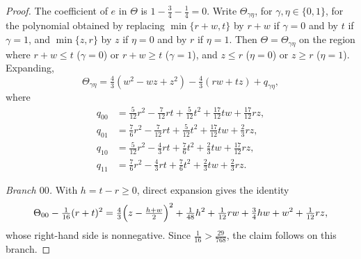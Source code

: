 \documentclass{amsart}
\theoremstyle{definition}
\numberwithin{equation}{section}
\numberwithin{table}{section}
\begin{document}
\begin{proof}
The coefficient of $e$ in $\Theta$ is $1-\frac34-\frac14=0$. Write $\Theta_{\gamma\eta}$, for $\gamma,\eta\in\{0,1\}$, for the polynomial obtained by replacing $\min\{r+w,t\}$ by $r+w$ if $\gamma=0$ and by $t$ if $\gamma=1$, and $\min\{z,r\}$ by $z$ if $\eta=0$ and by $r$ if $\eta=1$. Then $\Theta=\Theta_{\gamma\eta}$ on the region where $r+w\le t$ ($\gamma=0$) or $r+w\ge t$ ($\gamma=1$), and $z\le r$ ($\eta=0$) or $z\ge r$ ($\eta=1$). Expanding,
\[
\Theta_{\gamma\eta}=\tfrac43(w^2-wz+z^2)-\tfrac43(rw+tz)+q_{\gamma\eta},
\]
where
\begin{align*}
q_{00}&=\tfrac{5}{12}r^2-\tfrac{7}{12}rt+\tfrac{5}{12}t^2+\tfrac{17}{12}tw+\tfrac{17}{12}rz,\\
q_{01}&=\tfrac{7}{6}r^2-\tfrac{7}{12}rt+\tfrac{5}{12}t^2+\tfrac{17}{12}tw+\tfrac23rz,\\
q_{10}&=\tfrac{5}{12}r^2-\tfrac{4}{3}rt+\tfrac{7}{6}t^2+\tfrac23tw+\tfrac{17}{12}rz,\\
q_{11}&=\tfrac{7}{6}r^2-\tfrac{4}{3}rt+\tfrac{7}{6}t^2+\tfrac23tw+\tfrac23rz.
\end{align*}

\emph{Branch $00$.} With $h=t-r\ge 0$, direct expansion gives the identity
\[
\Theta_{00}-\tfrac{1}{16}(r+t)^2=\tfrac43\Bigl(z-\tfrac{h+w}{2}\Bigr)^2+\tfrac{1}{48}h^2+\tfrac{1}{12}rw+\tfrac34hw+w^2+\tfrac1{12}rz,
\]
whose right-hand side is nonnegative. Since $\frac1{16}>\frac{29}{768}$, the claim follows on this branch.


\end{proof}
\end{document}
